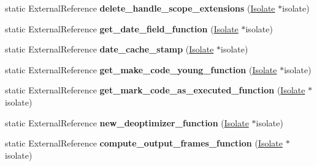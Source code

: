 \begin{DoxyCompactItemize}
\item 
\hypertarget{classv8_1_1internal_1_1_b_a_s_e___e_m_b_e_d_d_e_d_a871632b491851295ce80d03e27381e6e}{}static External\+Reference {\bfseries delete\+\_\+handle\+\_\+scope\+\_\+extensions} (\hyperlink{classv8_1_1internal_1_1_isolate}{Isolate} $\ast$isolate)\label{classv8_1_1internal_1_1_b_a_s_e___e_m_b_e_d_d_e_d_a871632b491851295ce80d03e27381e6e}

\item 
\hypertarget{classv8_1_1internal_1_1_b_a_s_e___e_m_b_e_d_d_e_d_ac026934de4a91082cd070cdad32ae75a}{}static External\+Reference {\bfseries get\+\_\+date\+\_\+field\+\_\+function} (\hyperlink{classv8_1_1internal_1_1_isolate}{Isolate} $\ast$isolate)\label{classv8_1_1internal_1_1_b_a_s_e___e_m_b_e_d_d_e_d_ac026934de4a91082cd070cdad32ae75a}

\item 
\hypertarget{classv8_1_1internal_1_1_b_a_s_e___e_m_b_e_d_d_e_d_a1dac1734a87b8109138efa5dfefecce6}{}static External\+Reference {\bfseries date\+\_\+cache\+\_\+stamp} (\hyperlink{classv8_1_1internal_1_1_isolate}{Isolate} $\ast$isolate)\label{classv8_1_1internal_1_1_b_a_s_e___e_m_b_e_d_d_e_d_a1dac1734a87b8109138efa5dfefecce6}

\item 
\hypertarget{classv8_1_1internal_1_1_b_a_s_e___e_m_b_e_d_d_e_d_a3b9a95c85e2aa993ab68f698bf340680}{}static External\+Reference {\bfseries get\+\_\+make\+\_\+code\+\_\+young\+\_\+function} (\hyperlink{classv8_1_1internal_1_1_isolate}{Isolate} $\ast$isolate)\label{classv8_1_1internal_1_1_b_a_s_e___e_m_b_e_d_d_e_d_a3b9a95c85e2aa993ab68f698bf340680}

\item 
\hypertarget{classv8_1_1internal_1_1_b_a_s_e___e_m_b_e_d_d_e_d_a10d437f80e0bc9841efcbb7bb789164e}{}static External\+Reference {\bfseries get\+\_\+mark\+\_\+code\+\_\+as\+\_\+executed\+\_\+function} (\hyperlink{classv8_1_1internal_1_1_isolate}{Isolate} $\ast$isolate)\label{classv8_1_1internal_1_1_b_a_s_e___e_m_b_e_d_d_e_d_a10d437f80e0bc9841efcbb7bb789164e}

\item 
\hypertarget{classv8_1_1internal_1_1_b_a_s_e___e_m_b_e_d_d_e_d_abe942a15bef5c42c18e2ce53e4c8aad8}{}static External\+Reference {\bfseries new\+\_\+deoptimizer\+\_\+function} (\hyperlink{classv8_1_1internal_1_1_isolate}{Isolate} $\ast$isolate)\label{classv8_1_1internal_1_1_b_a_s_e___e_m_b_e_d_d_e_d_abe942a15bef5c42c18e2ce53e4c8aad8}

\item 
\hypertarget{classv8_1_1internal_1_1_b_a_s_e___e_m_b_e_d_d_e_d_a52b7cc6ea9dd83dcc93a5839594ab861}{}static External\+Reference {\bfseries compute\+\_\+output\+\_\+frames\+\_\+function} (\hyperlink{classv8_1_1internal_1_1_isolate}{Isolate} $\ast$isolate)\label{classv8_1_1internal_1_1_b_a_s_e___e_m_b_e_d_d_e_d_a52b7cc6ea9dd83dcc93a5839594ab861}


\end{DoxyCompactItemize}
